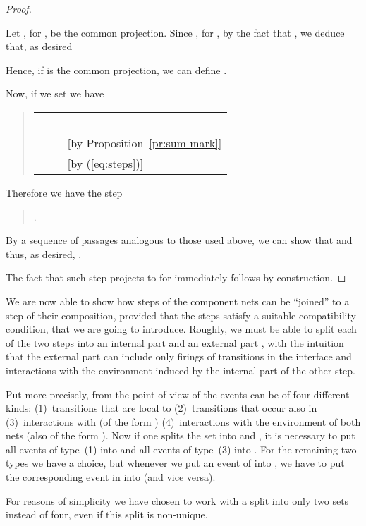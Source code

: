 \documentclass{LMCS}
\begin{document}
\begin{proof}
\begin{quote}
  \end{quote}
  Let , for , be the common projection.
Since , for , by the fact that , we deduce that, as desired
  \begin{quote}
    
  \end{quote}
  Hence, if  is the common projection, we can define
  .

  Now, if we set  we have
    \begin{quote}
      \begin{tabular}{lll}
        \\
\ \quad 
        & \quad & \\
\ \quad  
        & \quad & [by Proposition~\ref{pr:sum-mark}]\\
\ \quad   & &
        [by (\ref{eq:steps})]
      \end{tabular}
    \end{quote}  
    Therefore we have the step
    \begin{quote}
      .
    \end{quote}
    By a sequence of passages analogous to those used above, we can show that
     and thus, as desired,
    .

    The fact that such step projects to  for  immediately follows by construction.
\end{proof}

We are now able to show how steps of the component nets can be ``joined''
to a step of their composition, provided that the steps satisfy a
suitable compatibility condition, that we are going to introduce.
Roughly, we must be able to split each of the two steps  into
an internal part  and an external part , with the
intuition that the external part can include only firings of
transitions in the interface and interactions with the environment
induced by the internal part of the other step.

Put more precisely, from the point of view of  the events can be
of four different kinds: (1)~transitions that are local to 
(2)~transitions that occur also in  (3)~interactions with 
(of the form ) (4)~interactions with the environment of both
nets (also of the form ). Now if one splits the set 
into  and , it is necessary to put all events of
type~(1) into  and all events of type~(3) into . For the
remaining two types we have a choice, but whenever we put an event of
 into , we have to put the corresponding event in 
into  (and vice versa).

For reasons of simplicity we have chosen to work with a split into
only two sets instead of four, even if this split is non-unique.
\end{document}
